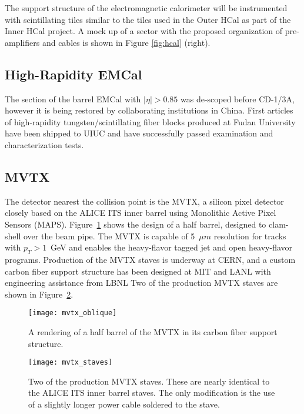 The support structure of the electromagnetic calorimeter will be
instrumented with scintillating tiles similar to the tiles used in the
Outer HCal as part of the Inner HCal project.  A mock up of a sector
with the proposed organization of pre-amplifiers and cables is shown
in Figure \ref{fig:hcal} (right).

\subsection{High-Rapidity EMCal} 

The section of the barrel EMCal with $|\eta|>0.85$ was de-scoped
before CD-1/3A, however it is being restored by collaborating
institutions in China.  First articles of high-rapidity
tungsten/scintillating fiber blocks produced at Fudan University have
been shipped to UIUC and have successfully passed examination and
characterization tests.

\subsection{MVTX}

The detector nearest the collision point is the MVTX, a silicon pixel
detector closely based on the ALICE ITS inner barrel using Monolithic Active Pixel Sensors (MAPS). 
Figure~\ref{fig:mvtx_oblique} shows the design of a half barrel, designed
to clam-shell over the beam pipe.  
The MVTX is capable of 5~$\mu m$ resolution for
tracks with $p_T > 1$~GeV and enables the heavy-flavor tagged jet
and open heavy-flavor programs.  
Production of the MVTX staves is
underway at CERN, and a custom carbon fiber support structure
has been designed at MIT and LANL with engineering assistance from LBNL
Two of the production MVTX staves are shown in Figure~\ref{fig:mvtx_staves}.

\begin{figure}[hbt!]
  \centering
  \texttt{[image: mvtx\_oblique]}
  \caption{A rendering of a half barrel of the MVTX in its carbon
    fiber support structure.}
  \label{fig:mvtx_oblique}
\end{figure}

\begin{figure}[hbt!]
  \centering
  \texttt{[image: mvtx\_staves]}
  \caption{Two of the production MVTX staves.  These are nearly
    identical to the ALICE ITS inner barrel staves.  The only
    modification is the use of a slightly longer power cable soldered
    to the stave.}
  \label{fig:mvtx_staves}
\end{figure}

